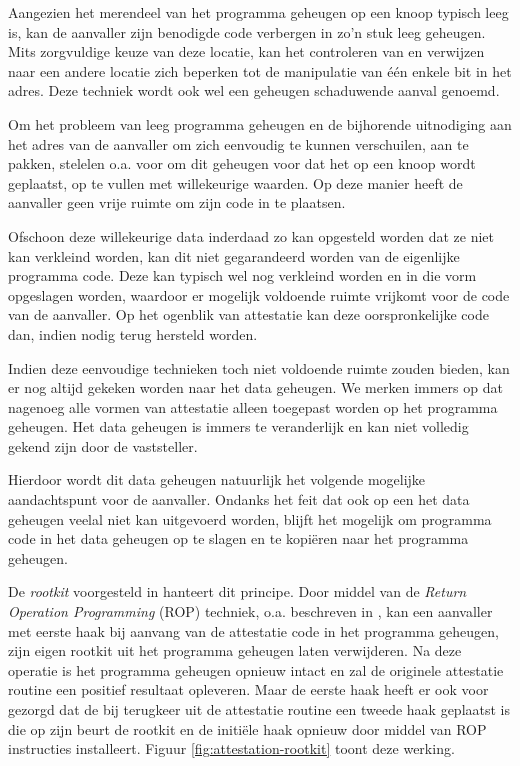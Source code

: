 Aangezien het merendeel van het programma geheugen op een knoop typisch leeg
is, kan de aanvaller zijn benodigde code verbergen in zo'n stuk leeg geheugen.
Mits zorgvuldige keuze van deze locatie, kan het controleren van en verwijzen
naar een andere locatie zich beperken tot de manipulatie van \'e\'en enkele bit
in het adres. Deze techniek wordt ook wel een geheugen schaduwende aanval
genoemd.

Om het probleem van leeg programma geheugen en de bijhorende uitnodiging aan
het adres van de aanvaller om zich eenvoudig te kunnen verschuilen, aan te
pakken, stelelen o.a. \cite{yang2007distributed,seshadri2008sake} voor om dit
geheugen voor dat het op een knoop wordt geplaatst, op te vullen met
willekeurige waarden. Op deze manier heeft de aanvaller geen vrije ruimte om
zijn code in te plaatsen.

Ofschoon deze willekeurige data inderdaad zo kan opgesteld worden dat ze niet
kan verkleind worden, kan dit niet gegarandeerd worden van de eigenlijke
programma code. Deze kan typisch wel nog verkleind worden en in die vorm
opgeslagen worden, waardoor er mogelijk voldoende ruimte vrijkomt voor de code
van de aanvaller. Op het ogenblik van attestatie kan deze oorspronkelijke code
dan, indien nodig terug hersteld worden.

Indien deze eenvoudige technieken toch niet voldoende ruimte zouden bieden, kan
er nog altijd gekeken worden naar het data geheugen. We merken immers op dat
nagenoeg alle vormen van attestatie alleen toegepast worden op het programma
geheugen. Het data geheugen is immers te veranderlijk en kan niet volledig
gekend zijn door de vaststeller.

Hierdoor wordt dit data geheugen natuurlijk het volgende mogelijke
aandachtspunt voor de aanvaller. Ondanks het feit dat ook op een \mcu het data
geheugen veelal niet kan uitgevoerd worden, blijft het mogelijk om programma
code in het data geheugen op te slagen en te kopi\"eren naar het programma
geheugen.

De \emph{rootkit} voorgesteld in \cite{castelluccia2009difficulty} hanteert dit
principe. Door middel van de \emph{Return Operation Programming} (ROP)
techniek, o.a. beschreven in \cite{prandini2012return}, kan een aanvaller met
eerste haak bij aanvang van de attestatie code in het programma geheugen, zijn
eigen rootkit uit het programma geheugen laten verwijderen. Na deze operatie is
het programma geheugen opnieuw intact en zal de originele attestatie routine
een positief resultaat opleveren. Maar de eerste haak heeft er ook voor gezorgd
dat de bij terugkeer uit de attestatie routine een tweede haak geplaatst is die
op zijn beurt de rootkit en de initi\"ele haak opnieuw door middel van ROP
instructies installeert. Figuur \ref{fig:attestation-rootkit} toont deze
werking.

